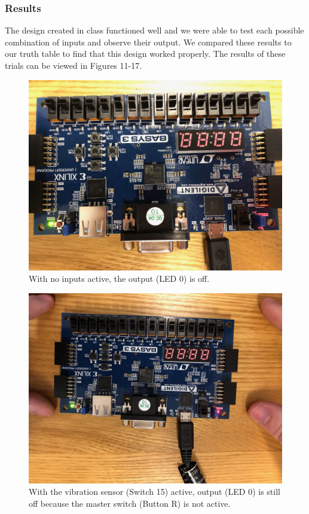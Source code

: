 \documentclass[11pt]{article}
\begin{document}
\subsubsection{Results}

The design created in class functioned well and we were able to test each possible combination of inputs and observe their output. We compared these results to our truth table to find that this design worked properly. The results of these trials can be viewed in Figures 11-17.

\begin{figure}[H]
	\includegraphics[width=\textwidth]{report_images/Lab1BoardPictures/Lab1Part2/IMG_0411.jpg}
	\caption{\label{fig:figure-name}With no inputs active, the output (LED 0) is off. }
\end{figure}

\begin{figure}[H]
	\includegraphics[width=\textwidth]{report_images/Lab1BoardPictures/Lab1Part2/IMG_0412.jpg}
	\caption{\label{fig:figure-name}With the vibration sensor (Switch 15) active, output (LED 0) is still off because the master switch (Button R) is not active.}
\end{figure}
\end{document}

